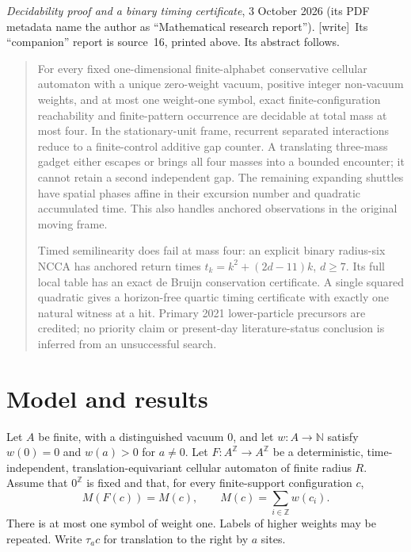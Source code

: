 \documentclass[11pt,letterpaper]{article}
\numberwithin{equation}{section}
\theoremstyle{definition}
\theoremstyle{remark}
\newcommand{\Z}{\mathbb Z}
\newcommand{\NN}{\mathbb N}
\newcommand{\wtag}{\textup{[write]}}
\begin{document}
\bigskip
{}
\par
\noindent\emph{Decidability proof and a binary timing certificate}, 3 October 2026 (its PDF metadata name the author as ``Mathematical research report''). \wtag\ Its ``companion'' report is source~16, printed above. Its abstract follows.
\begin{quote}\small
For every fixed one-dimensional finite-alphabet conservative cellular automaton
with a unique zero-weight vacuum, positive integer non-vacuum weights, and at
most one weight-one symbol, exact finite-configuration reachability and
finite-pattern occurrence are decidable at total mass at most four.
In the stationary-unit frame, recurrent separated interactions reduce to a
finite-control additive gap counter. A translating three-mass gadget either
escapes or brings all four masses into a bounded encounter; it cannot retain a
second independent gap. The remaining expanding shuttles have spatial phases
affine in their excursion number and quadratic accumulated time. This also
handles anchored observations in the original moving frame.

Timed semilinearity does fail at mass four: an explicit binary radius-six
NCCA has anchored return times $t_k=k^2+(2d-11)k$, $d\ge7$. Its full local
table has an exact de Bruijn conservation certificate. A single squared
quadratic gives a horizon-free quartic timing certificate with exactly one
natural witness at a hit. Primary 2021 lower-particle precursors are credited;
no priority claim or present-day literature-status conclusion is inferred
from an unsuccessful search.
\end{quote}

\section{Model and results}\label{smc:fm:sec:model}
Let $A$ be finite, with a distinguished vacuum $0$, and let
$w:A\to\NN$ satisfy $w(0)=0$ and $w(a)>0$ for $a\ne0$.
Let $F:A^{\Z}\to A^{\Z}$ be a deterministic, time-independent,
translation-equivariant cellular automaton of finite radius $R$. Assume that
$0^{\Z}$ is fixed and that, for every finite-support configuration $c$,
\[
 M(F(c))=M(c),\qquad M(c)=\sum_{i\in\Z}w(c_i).
\]
There is at most one symbol of weight one. Labels of higher weights may be
repeated. Write $\tau_a c$ for translation to the right by $a$ sites.
\end{document}
